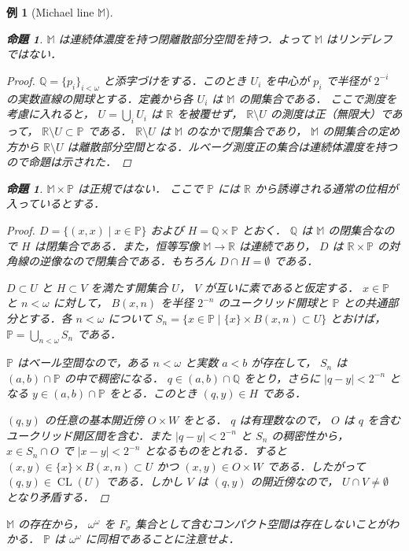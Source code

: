 \documentclass[leqno, 12pt]{ltjsarticle}
\newtheorem{prop}[thm]{命題}
\newtheorem{exam}[thm]{例}
\renewcommand{\qq}{\mathbb{Q}}
\newcommand{\rr}{\mathbb{R}}
\newcommand{\MichaelLine}{\mathbb{M}}
\newcommand{\Irrationals}{\mathbb{P}}
\newcommand{\BaireSpace}{\omega^{\omega}}
\DeclareMathOperator{\cl}{CL}
\begin{document}
\begin{exam}[Michael line $\MichaelLine$]
\begin{prop}
$\MichaelLine$
は連続体濃度を持つ閉離散部分空間を持つ．よって
$\MichaelLine$
はリンデレフではない．
\end{prop}
\begin{proof}
$\qq=\{p_{i}\}_{i<\omega}$
と添字づけをする．このとき
$U_{i}$
を中心が
$p_{i}$
で半径が
$2^{-i}$
の実数直線の開球とする．定義から各
$U_{i}$
は
$\MichaelLine$
の開集合である．
ここで測度を考慮に入れると，
$U=\bigcup_{i}U_{i}$
は
$\rr$
を被覆せず，
$\rr\setminus U$
の測度は正（無限大）であって，
$\rr \setminus U\subset \Irrationals$
である．
$\rr\setminus U$
は
$\MichaelLine$
のなかで閉集合であり，
$\MichaelLine$
の開集合の定め方から
$\rr\setminus U$
は離散部分空間となる．ルベーグ測度正の集合は連続体濃度を持つので命題は示された．
\end{proof}

\begin{prop}
$\MichaelLine\times \Irrationals$
は正規ではない．
ここで
$\Irrationals$
には
$\rr$
から誘導される通常の位相が入っているとする．
\end{prop}
\begin{proof}
$D=\{(x,x) \mid x\in\Irrationals\}$
および
$H=\qq\times\Irrationals$
とおく．
$\qq$
は
$\MichaelLine$
の閉集合なので
$H$
は閉集合である．また，恒等写像
$\MichaelLine\to\rr$
は連続であり，
$D$
は
$\rr\times\Irrationals$
の対角線の逆像なので閉集合である．もちろん
$D\cap H=\emptyset$
である．

$D\subset U$
と
$H\subset V$
を満たす開集合
$U$，
$V$
が互いに素であると仮定する．
$x\in\Irrationals$
と
$n<\omega$
に対して，
$B(x,n)$
を半径
$2^{-n}$
のユークリッド開球と
$\Irrationals$
との共通部分とする．各
$n<\omega$
について
$S_{n}=\{x\in\Irrationals \mid \{x\}\times B(x,n)\subset U\}$
とおけば，
$\Irrationals=\bigcup_{n<\omega}S_{n}$
である．

$\Irrationals$
はベール空間なので，ある
$n<\omega$
と実数
$a<b$
が存在して，
$S_{n}$
は
$(a,b)\cap\Irrationals$
の中で稠密になる．
$q\in(a,b)\cap\qq$
をとり，さらに
$|q-y|<2^{-n}$
となる
$y\in(a,b)\cap\Irrationals$
をとる．このとき
$(q,y)\in H$
である．

$(q,y)$
の任意の基本開近傍
$O\times W$
をとる．
$q$
は有理数なので，
$O$
は
$q$
を含むユークリッド開区間を含む．また
$|q-y|<2^{-n}$
と
$S_{n}$
の稠密性から，
$x\in S_{n}\cap O$
で
$|x-y|<2^{-n}$
となるものをとれる．すると
$(x,y)\in\{x\}\times B(x,n)\subset U$
かつ
$(x,y)\in O\times W$
である．したがって
$(q,y)\in\cl(U)$
である．しかし
$V$
は
$(q,y)$
の開近傍なので，
$U\cap V\neq\emptyset$
となり矛盾する．
\end{proof}


$\MichaelLine$
の存在から，
$\BaireSpace$
を
$F_{\sigma}$
集合として含むコンパクト空間は存在しないことがわかる．
$\Irrationals$
は
$\BaireSpace$
に同相であることに注意せよ．
\end{exam}
\end{document}
